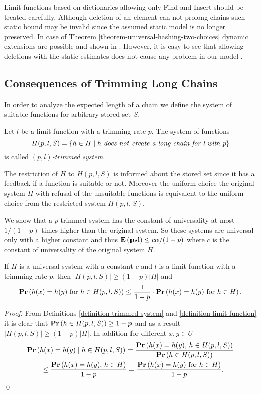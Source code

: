 Limit functions based on dictionaries allowing only Find and Insert should be treated carefully. Although deletion of an element can not prolong chains such static bound may be invalid since the assumed static model is no longer preserved. In case of Theorem \ref{theorem-universal-hashing-two-choices} dynamic extensions are possible and shown in \cite{DBLP:journals/jacm/Vocking03}. However, it is easy to see that allowing deletions with the static estimates does not cause any problem in our model .

\subsection{Consequences of Trimming Long Chains}
In order to analyze the expected length of a chain we define the system of suitable functions for arbitrary stored set $S$.
\begin{definition}
\label{definition-trimmed-system}
Let $l$ be a limit function with a trimming rate $p$. The system of functions \[ H(p, l, S) = \{ h \in H \mid h \textit{ does not create a long chain for l with p} \} \] is called \emph{$(p, l)$-trimmed system}.
\end{definition}

The restriction of $H$ to $H(p, l, S)$ is informed about the stored set since it has a feedback if a function is suitable or not. Moreover the uniform choice the original system $H$ with refusal of the unsuitable functions is equivalent to the uniform choice from the restricted system $H(p, l, S)$.

We show that a $p$-trimmed system has the constant of universality at most $1 / (1 - p)$ times higher than the original system. So these systems are universal only with a higher constant and thus $\mathbf{E}\left(\mathbf{psl}\right) \leq c\alpha/(1-p)$ where $c$ is the constant of universality of the original system $H$.

\begin{lemma}
\label{lemma-trimmed-system}
If $H$ is a universal system with a constant $c$ and $l$ is a limit function with a trimming rate $p$, then $|H(p, l, S)| \geq (1 - p)|H|$ and  \[ \mathbf{Pr}\left(h(x) = h(y) \mbox{ for } h \in H(p, l, S)\right) \leq \frac{1}{1 - p} \cdot \mathbf{Pr}\left(h(x) = h(y) \mbox{ for } h \in H\right). \]
\end{lemma}
\begin{proof}
From Definitions \ref{definition-trimmed-system} and \ref{definition-limit-function} it is clear that $\mathbf{Pr}\left(h \in H(p, l, S)\right) \geq 1 - p$ and as a result $|H(p, l, S)| \geq (1 - p)|H|$. In addition for different $x, y \in U$ 
\[
\begin{split}
& \mathbf{Pr}\left(h(x) = h(y) \mid h \in H(p, l, S)\right) 
	= \frac{\mathbf{Pr}\left(h(x) = h(y),\, h \in H(p, l, S)\right)}{\mathbf{Pr}\left(h \in H(p, l, S)\right)} \\
	& \qquad \leq \frac{\mathbf{Pr}\left(h(x) = h(y),\, h \in H\right)}{1 - p} = \frac{\mathbf{Pr}\left(h(x) = h(y) \mbox{ for } h \in H\right)}{1 - p}. \\
\end{split}
\]
\qed
\end{proof}

